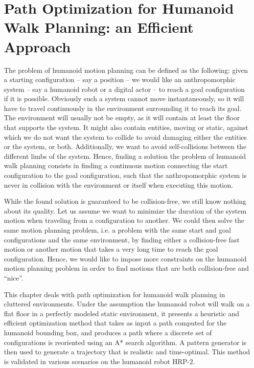 \chapter{Path Optimization for Humanoid Walk Planning: an Efficient Approach}
\label{chap:path-optim}

The problem of humanoid motion planning can be defined as the
following: given a starting configuration -- say a position -- we
would like an anthropomorphic system -- say a humanoid robot or a
digital actor -- to reach a goal configuration if it is
possible. Obviously such a system cannot move instantaneously, so it
will have to travel continuously in the environment surrounding it to
reach its goal. The environment will usually not be empty, as it will
contain at least the floor that supports the system. It might also
contain entities, moving or static, against which we do not want the
system to collide to avoid damaging either the entities or the system,
or both. Additionally, we want to avoid self-collisions between the
different limbs of the system. Hence, finding a solution the problem
of humanoid walk planning consists in finding a continuous motion
connecting the start configuration to the goal configuration, such
that the anthropomorphic system is never in collision with the
environment or itself when executing this motion.

While the found solution is guaranteed to be collision-free, we still
know nothing about its quality. Let us assume we want to minimize the
duration of the system motion when traveling from a configuration to
another. We could then solve the same motion planning problem, i.e. a
problem with the same start and goal configurations and the same
environment, by finding either a collision-free fast motion or another
motion that takes a very long time to reach the goal
configuration. Hence, we would like to impose more constraints on the
humanoid motion planning problem in order to find motions that are
both collision-free and ``nice''.

This chapter deals with path optimization for humanoid walk planning
in cluttered environments. Under the assumption the humanoid robot
will walk on a flat floor in a perfectly modeled static environment,
it presents a heuristic and efficient optimization method that takes
as input a path computed for the humanoid bounding box, and produces a
path where a discrete set of configurations is reoriented using an A*
search algorithm. A pattern generator is then used to generate a
trajectory that is realistic and time-optimal. This method is
validated in various scenarios on the humanoid robot HRP-2.


